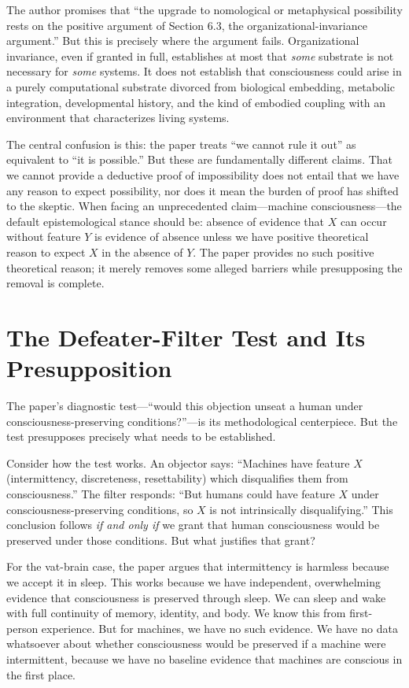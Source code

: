 \documentclass[11pt]{article}
\begin{document}
The author promises that ``the upgrade to nomological or metaphysical possibility rests on the positive argument of Section 6.3, the organizational-invariance argument.'' But this is precisely where the argument fails. Organizational invariance, even if granted in full, establishes at most that \textit{some} substrate is not necessary for \textit{some} systems. It does not establish that consciousness could arise in a purely computational substrate divorced from biological embedding, metabolic integration, developmental history, and the kind of embodied coupling with an environment that characterizes living systems.

The central confusion is this: the paper treats ``we cannot rule it out'' as equivalent to ``it is possible.'' But these are fundamentally different claims. That we cannot provide a deductive proof of impossibility does not entail that we have any reason to expect possibility, nor does it mean the burden of proof has shifted to the skeptic. When facing an unprecedented claim---machine consciousness---the default epistemological stance should be: absence of evidence that $X$ can occur without feature $Y$ is evidence of absence unless we have positive theoretical reason to expect $X$ in the absence of $Y$. The paper provides no such positive theoretical reason; it merely removes some alleged barriers while presupposing the removal is complete.

\section{The Defeater-Filter Test and Its Presupposition}

The paper's diagnostic test---``would this objection unseat a human under consciousness-preserving conditions?''---is its methodological centerpiece. But the test presupposes precisely what needs to be established.

Consider how the test works. An objector says: ``Machines have feature $X$ (intermittency, discreteness, resettability) which disqualifies them from consciousness.'' The filter responds: ``But humans could have feature $X$ under consciousness-preserving conditions, so $X$ is not intrinsically disqualifying.'' This conclusion follows \textit{if and only if} we grant that human consciousness would be preserved under those conditions. But what justifies that grant?

For the vat-brain case, the paper argues that intermittency is harmless because we accept it in sleep. This works because we have independent, overwhelming evidence that consciousness is preserved through sleep. We can sleep and wake with full continuity of memory, identity, and body. We know this from first-person experience. But for machines, we have no such evidence. We have no data whatsoever about whether consciousness would be preserved if a machine were intermittent, because we have no baseline evidence that machines are conscious in the first place.
\end{document}
